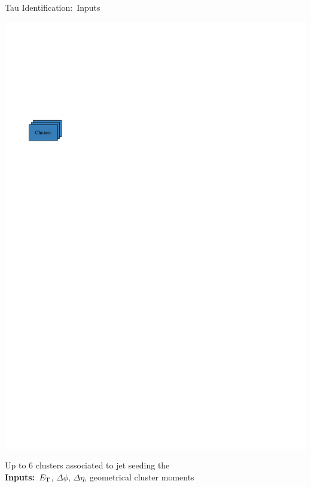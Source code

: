 \documentclass[11pt, xcolor={dvipsnames}, aspectratio=169, notes]{beamer}
\begin{document}
\begin{frame}{Tau Identification:\ Inputs}
\begin{minipage}[c][2.2cm][c]{0.25\textwidth}
    \includegraphics[scale=1]{tauid/cluster_icon}
  \end{minipage}%
  \begin{minipage}[c][2.2cm][c]{0.75\textwidth}
    Up to 6 clusters associated to jet seeding the \tauhadvis\\[0.5\baselineskip]
    \textbf{Inputs:}\ $E_{\text{T}}$, $\Delta \phi$, $\Delta \eta$, geometrical cluster
    moments
  \end{minipage}
\end{frame}



\end{document}

